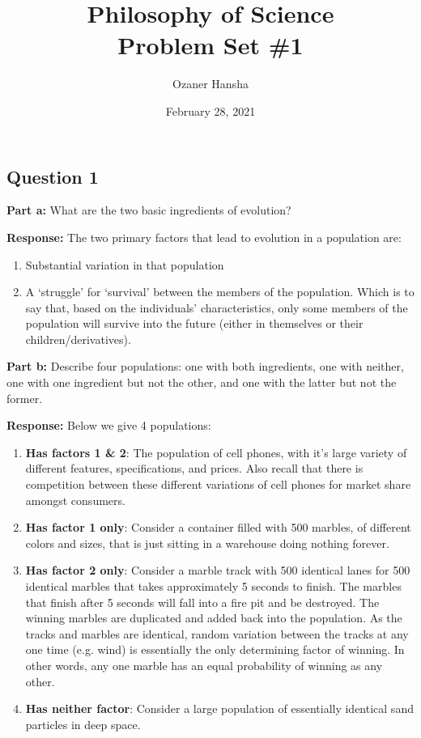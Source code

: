 \documentclass{article}
\begin{document}
\title{Philosophy of Science\\ Problem Set \#1}
\author{Ozaner Hansha}
\date{February 28, 2021}
\maketitle

\subsection*{Question 1}
\noindent\textbf{Part a:} What are the two basic ingredients of evolution?
\bigskip

\noindent\textbf{Response:} The two primary factors that lead to evolution in a population are:
\begin{enumerate}
    \item Substantial variation in that population
    \item A `struggle' for `survival' between the members of the population. Which is to say that, based on the individuals' characteristics, only some members of the population will survive into the future (either in themselves or their children/derivatives).
\end{enumerate}
\bigskip

\noindent\textbf{Part b:} Describe four populations: one with both ingredients, one with neither, one with one ingredient but not the other, and one with the latter but not the former.
\bigskip

\noindent\textbf{Response:} Below we give 4 populations:
\begin{enumerate}
    \item \textbf{Has factors 1 \& 2}: The population of cell phones, with it's large variety of different features, specifications, and prices. Also recall that there is competition between these different variations of cell phones for market share amongst consumers.
    \item \textbf{Has factor 1 only}: Consider a container filled with 500 marbles, of different colors and sizes, that is just sitting in a warehouse doing nothing forever.
    \item \textbf{Has factor 2 only}: Consider a marble track with 500 identical lanes for 500 identical marbles that takes approximately 5 seconds to finish. The marbles that finish after 5 seconds will fall into a fire pit and be destroyed. The winning marbles are duplicated and added back into the population. As the tracks and marbles are identical, random variation between the tracks at any one time (e.g. wind) is essentially the only determining factor of winning. In other words, any one marble has an equal probability of winning as any other.
    \item \textbf{Has neither factor}: Consider a large population of essentially identical sand particles in deep space.
\end{enumerate}
\bigskip
\end{document}
